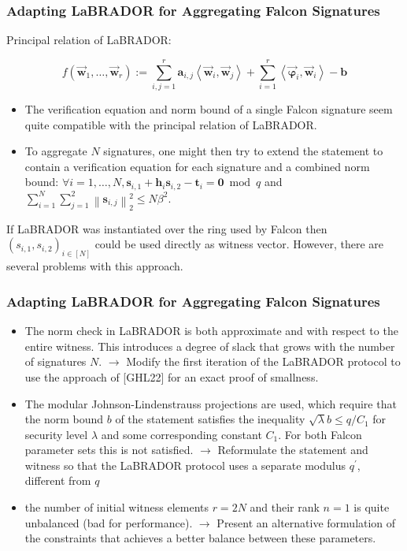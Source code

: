 \documentclass{beamer}
\begin{document}
\begin{frame}
	\frametitle{Adapting LaBRADOR for Aggregating Falcon Signatures}
	
	Principal relation of LaBRADOR:
	
	$$
f\left(\overrightarrow{\boldsymbol{w}}_1, \ldots, \overrightarrow{\boldsymbol{w}}_r\right):=\sum_{i, j=1}^r \boldsymbol{a}_{i, j}\left\langle\overrightarrow{\boldsymbol{w}}_i, \overrightarrow{\boldsymbol{w}}_j\right\rangle+\sum_{i=1}^r\left\langle\overrightarrow{\boldsymbol{\varphi}}_i, \overrightarrow{\boldsymbol{w}}_i\right\rangle-\boldsymbol{b}
$$

\begin{itemize}
	\item The verification equation and norm bound of a single Falcon signature seem quite compatible with the principal relation of LaBRADOR. 
	\item To aggregate $N$ signatures, one might then try to extend the statement to contain a verification equation for each signature and a combined norm bound: $\forall i=1, \ldots, N, \boldsymbol{s}_{i, 1}+\boldsymbol{h}_i \boldsymbol{s}_{i, 2}-\boldsymbol{t}_i=\mathbf{0} \bmod q$ and $\sum_{i=1}^N \sum_{j=1}^2\left\|\boldsymbol{s}_{i, j}\right\|_2^2 \leq N \beta^2$. 
\end{itemize}
If LaBRADOR was instantiated over the ring used by Falcon then $\left(s_{i, 1}, s_{i, 2}\right)_{i \in[N]}$ could be used directly as witness vector. However, there are several problems with this approach.
	
\end{frame}

\begin{frame}
	\frametitle{Adapting LaBRADOR for Aggregating Falcon Signatures}
	
	\begin{itemize}
		\item The norm check in LaBRADOR is both approximate and with respect to the entire witness. This introduces a degree of slack that grows with the number of signatures $N$. $\rightarrow$ Modify the first iteration of the LaBRADOR protocol to use the approach of [GHL22] for an exact proof of smallness.
		\item The modular Johnson-Lindenstrauss projections are used, which require that the norm bound $b$ of the statement satisfies the inequality $\sqrt{\lambda} b \leq q / C_1$ for security level $\lambda$ and some corresponding constant $C_1$. For both Falcon parameter sets this is not satisfied. $\rightarrow$ Reformulate the statement and witness so that the LaBRADOR protocol uses a separate modulus $q^{\prime}$, different from $q$
		\item the number of initial witness elements $r=2 N$ and their rank $n=1$ is quite unbalanced (bad for performance). $\rightarrow$ Present an alternative formulation of the constraints that achieves a better balance between these parameters. 
	\end{itemize}
	

	

\end{frame}
\end{document}
